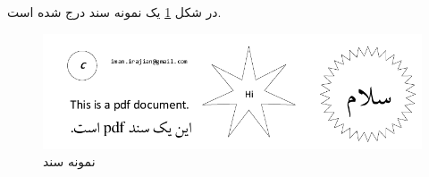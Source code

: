 \documentclass[a4paper]{book} %
\begin{document}
	در شکل
	\ref{fig:sample}
	یک نمونه سند
	درج شده است.	
	\begin{figure}		
		\centerline{\includegraphics[width=\textwidth]{images/sample}}
		\caption{%
		نمونه سند
		}
		\label{fig:sample}
	\end{figure}
	
\end{document}
